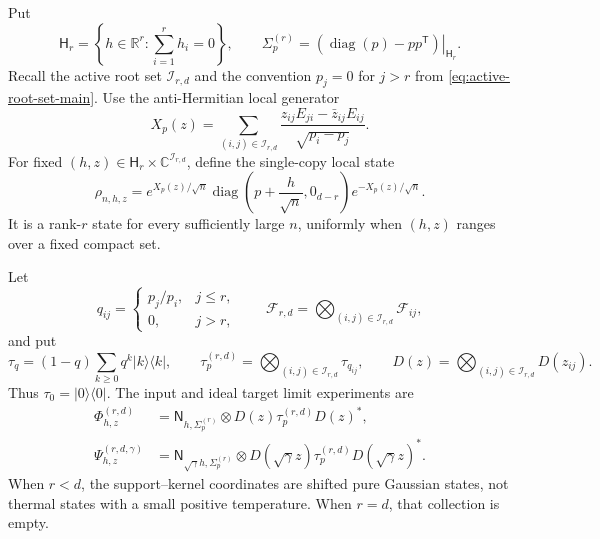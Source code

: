 \documentclass[11pt]{article}
\theoremstyle{remark}
\theoremstyle{plain}
\newcommand{\C}{\mathbb C}
\newcommand{\R}{\mathbb R}
\newcommand{\cF}{\mathcal F}
\newcommand{\diag}{\operatorname{diag}}
\newcommand{\proj}[1]{|#1\rangle\!\langle #1|}
\newcommand{\ot}{\otimes}
\begin{document}
Put
\[
  \mathsf H_r=\left\{h\in\R^r:\sum_{i=1}^r h_i=0\right\},
  \qquad
  \Sigma_p^{(r)}
  =\left.(\diag(p)-pp^{\mathsf T})\right|_{\mathsf H_r}.
\]
Recall the active root set \(\mathcal I_{r,d}\) and the convention
\(p_j=0\) for \(j>r\) from \eqref{eq:active-root-set-main}.  Use the
anti-Hermitian local generator
\begin{equation}
  X_p(z)=\sum_{(i,j)\in\mathcal I_{r,d}}
  \frac{z_{ij}E_{ji}-\bar z_{ij}E_{ij}}{\sqrt{p_i-p_j}}.
  \label{eq:low-rank-generator}
\end{equation}
For fixed \((h,z)\in\mathsf H_r\times\C^{\mathcal I_{r,d}}\), define the
single-copy local state
\begin{equation}
  \rho_{n,h,z}
  =e^{X_p(z)/\sqrt n}
   \diag\!\left(p+\frac h{\sqrt n},0_{d-r}\right)
   e^{-X_p(z)/\sqrt n}.
  \label{eq:low-rank-local-state}
\end{equation}
It is a rank-\(r\) state for every sufficiently large \(n\), uniformly when
\((h,z)\) ranges over a fixed compact set.

Let
\[
  q_{ij}=\begin{cases}p_j/p_i,&j\le r,\\0,&j>r,\end{cases}
  \qquad
  \cF_{r,d}=\bigotimes_{(i,j)\in\mathcal I_{r,d}}\cF_{ij},
\]
and put
\[
  \tau_q=(1-q)\sum_{k\ge0}q^k\proj{k},
  \qquad
  \tau_p^{(r,d)}=\bigotimes_{(i,j)\in\mathcal I_{r,d}}\tau_{q_{ij}},
  \qquad
  D(z)=\bigotimes_{(i,j)\in\mathcal I_{r,d}}D(z_{ij}).
\]
Thus \(\tau_0=\proj0\).  The input and ideal target limit experiments are
\begin{align}
  \Phi_{h,z}^{(r,d)}
  &=\mathsf N_{h,\Sigma_p^{(r)}}\ot
    D(z)\tau_p^{(r,d)}D(z)^*,
  \label{eq:low-rank-LAN-model}\\
  \Psi_{h,z}^{(r,d,\gamma)}
  &=\mathsf N_{\sqrt\gamma h,\Sigma_p^{(r)}}\ot
    D(\sqrt\gamma z)\tau_p^{(r,d)}D(\sqrt\gamma z)^*.
  \label{eq:low-rank-LAN-target}
\end{align}
When \(r<d\), the support--kernel coordinates are shifted pure Gaussian
states, not thermal states with a small positive temperature.  When \(r=d\),
that collection is empty.
\end{document}
